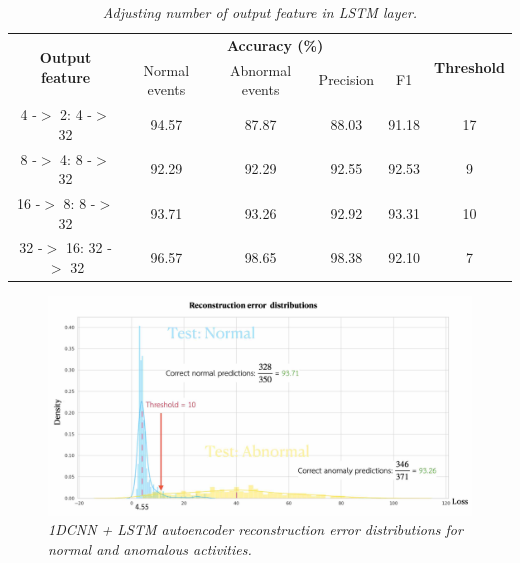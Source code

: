 \begin{table}[H]
  \begin{center}
    \caption[Adjusting number of output feature in LSTM layer.]{\emph{Adjusting number of output feature in LSTM layer.} \\ \hspace{\textwidth}}\label{tab:cnnlstm}
    \begin{tabular}{c c c c c c c}
      \hline
      \multicolumn{2}{c}{\multirow{2}{*}{\textbf{Output feature}}} & \multicolumn{4}{c}{\textbf{Accuracy (\%)}} & \multirow{2}{*}{\textbf{Threshold}}                                      \\
      \cline{3-6}
                                                                   &                                            & Normal events                       & Abnormal events & Precision & F1 & \\
      \hline
      \multicolumn{2}{c}{ 4 -$>$  2:  4 -$>$  32}                  & 94.57                                      & 87.87                               & 88.03           & 91.18     & 17   \\
      \multicolumn{2}{c}{ 8 -$>$  4:  8 -$>$  32}                  & 92.29                                      & 92.29                               & 92.55           & 92.53     & 9    \\
      \multicolumn{2}{c}{16 -$>$  8:  8 -$>$  32}                  & 93.71                                      & 93.26                               & 92.92           & 93.31     & 10   \\
      \multicolumn{2}{c}{32 -$>$ 16: 32 -$>$  32}                  & 96.57                                      & 98.65                               & 98.38           & 92.10     & 7    \\
      \hline
    \end{tabular}
  \end{center}
\end{table}

\begin{figure}[H]
  \centering
  \caption[1DCNN + LSTM autoencoder reconstruction error distributions for normal and anomalous activities.]{\emph{1DCNN + LSTM autoencoder reconstruction error distributions for normal and anomalous activities.}} \label{fig:autoencoder_cnnlstm_outcome}
  \includegraphics[scale = 0.18]{figures/autoencoder_cnnlstm_outcome.jpg}
\end{figure}

